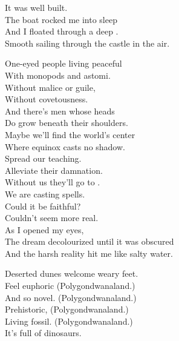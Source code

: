 It was well built. \\
The boat rocked me into sleep \\
And I floated through a deep . \\
Smooth sailing through the castle in the air. \\


One-eyed people living peaceful \\
With monopods and astomi. \\
Without malice or guile, \\
Without covetousness. \\

And there's men whose heads \\
Do grow beneath their shoulders. \\
Maybe we'll find the world's center \\
Where equinox casts no shadow. \\

Spread our teaching. \\
Alleviate their damnation. \\
Without us they'll go to . \\
We are casting spells. \\

Could it be faithful? \\
Couldn't seem more real. \\
As I opened my eyes, \\
The dream decolourized until it was obscured \\
And the harsh reality hit me like salty water. \\





Deserted dunes welcome weary feet. \\
Feel euphoric (Polygondwanaland.) \\
And so novel. (Polygondwanaland.) \\
Prehistoric, (Polygondwanaland.) \\
Living fossil. (Polygondwanaland.) \\

It's full of dinosaurs. \\

